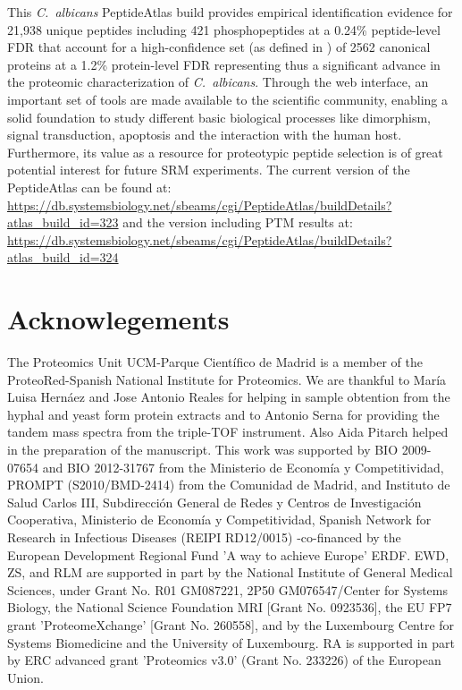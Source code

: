 This \textit{\mbox{C. albicans}} PeptideAtlas build provides empirical identification
 evidence for 21,938 unique peptides including 421
phosphopeptides at a 0.24\% peptide-level FDR that account for a
high-confidence set (as defined in \citep{Farrah2011}) of 2562 canonical proteins
at a 1.2\% protein-level FDR representing thus a significant
advance in the proteomic characterization of \textit{\mbox{C. albicans}}.
Through the web interface, an important set of tools are
made available to the scientific community, enabling a solid
foundation to study different basic biological processes like
dimorphism, signal transduction, apoptosis and the interaction
with the human host. Furthermore, its value as a resource for
proteotypic peptide selection is of great potential interest for
future SRM experiments.
The current version of the PeptideAtlas can be found
at: \newline
\href{https://db.systemsbiology.net/sbeams/cgi/PeptideAtlas/buildDetails?atlas_build_id=323}{https://db.systemsbiology.net/sbeams/cgi/PeptideAtlas/buildDetails?atlas\_build\_id=323}
\newline
and the version including PTM results at:\newline
\href{https://db.systemsbiology.net/sbeams/cgi/PeptideAtlas/buildDetails?atlas_build_id=324}{https://db.systemsbiology.net/sbeams/cgi/PeptideAtlas/buildDetails?atlas\_build\_id=324}


\section*{Acknowlegements}
The Proteomics Unit UCM-Parque Cient\'ifico de Madrid is a
member of the ProteoRed-Spanish National Institute for
Proteomics.
We are thankful to Mar\'ia Luisa Hern\'aez and Jose Antonio
Reales for helping in sample obtention from the hyphal and
yeast form protein extracts and to Antonio Serna for providing
the tandem mass spectra from the triple-TOF instrument. Also
Aida Pitarch helped in the preparation of the manuscript.
This work was supported by BIO 2009-07654 and BIO
2012-31767 from the Ministerio de Econom\'ia y Competitividad,
PROMPT (S2010/BMD-2414) from the Comunidad de Madrid, and
Instituto de Salud Carlos III, Subdirecci\'on General de Redes y
Centros de Investigaci\'on Cooperativa, Ministerio de Econom\'ia y
Competitividad, Spanish Network for Research in Infectious
Diseases (REIPI RD12/0015) -co-financed by the European
Development Regional Fund 'A way to achieve Europe' ERDF.
EWD, ZS, and RLM are supported in part by the National
Institute of General Medical Sciences, under Grant No. R01
GM087221, 2P50 GM076547/Center for Systems Biology, the
National Science Foundation MRI [Grant No. 0923536], the EU
FP7 grant 'ProteomeXchange' [Grant No. 260558], and by the
Luxembourg Centre for Systems Biomedicine and the University
of Luxembourg.
RA is supported in part by ERC advanced grant 'Proteomics
v3.0' (Grant No. 233226) of the European Union.


